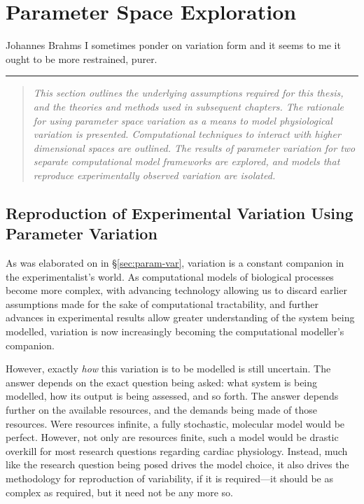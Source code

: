 \documentclass[../thesis-main.tex]{subfiles}
\begin{document}
\chapter{Parameter Space Exploration}
\label{ch:paramSpace}

\begin{aquote}{Johannes Brahms}
  {\selectfont
   I sometimes ponder on variation form and it seems to me it ought to be more restrained, purer.
  }
\end{aquote}
\rule{\linewidth}{0.25mm}

 \begin{quote}
  \emph{This section outlines the underlying assumptions required for this thesis, and the theories and methods used in subsequent chapters. The rationale for using parameter space variation as a means to model physiological variation is presented. Computational techniques to interact with higher dimensional spaces are outlined. The results of parameter variation for two separate computational model frameworks are explored, and models that reproduce experimentally observed variation are isolated.}
 \end{quote}
 
 \section{Reproduction of Experimental Variation Using Parameter Variation}
 \label{sec:paramSpace-rationale}
 As was elaborated on in \S\ref{sec:param-var}, variation is a constant companion in the experimentalist's world. As computational models of biological processes become more complex, with advancing technology allowing us to discard earlier assumptions made for the sake of computational tractability, and further advances in experimental results allow greater understanding of the system being modelled, variation is now increasingly becoming the computational modeller's companion.
 
 However, exactly \emph{how} this variation is to be modelled is still uncertain. The answer depends on the exact question being asked: what system is being modelled, how its output is being assessed, and so forth. The answer depends further on the available resources, and the demands being made of those resources. Were resources infinite, a fully stochastic, molecular model would be perfect. However, not only are resources finite, such a model would be drastic overkill for most research questions regarding cardiac physiology. Instead, much like the research question being posed drives the model choice, it also drives the methodology for reproduction of variability, if it is required---it should be as complex as required, but it need not be any more so.
 
\end{document}
